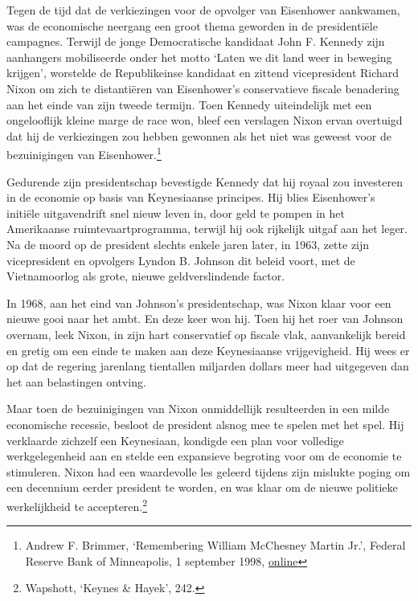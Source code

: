 \documentclass[
  a5paper,
  smalldemyvopaper,11pt,twoside,onecolumn,openright,extrafontsizes]{memoir}
\begin{document}
Tegen de tijd dat de verkiezingen voor de opvolger van Eisenhower
aankwamen, was de economische neergang een groot thema geworden in de
presidentiële campagnes. Terwijl de jonge Democratische kandidaat John
F. Kennedy zijn aanhangers mobiliseerde onder het motto `Laten we dit
land weer in beweging krijgen', worstelde de Republikeinse kandidaat en
zittend vicepresident Richard Nixon om zich te distantiëren van
Eisenhower's conservatieve fiscale benadering aan het einde van zijn
tweede termijn. Toen Kennedy uiteindelijk met een ongelooflijk kleine
marge de race won, bleef een verslagen Nixon ervan overtuigd dat hij de
verkiezingen zou hebben gewonnen als het niet was geweest voor de
bezuinigingen van Eisenhower.\footnote{\hspace{0pt}Andrew F. Brimmer,
  `Remembering William McChesney Martin Jr.', Federal Reserve Bank of
  Minneapolis, 1 september 1998,
  \href{https://www.minneapolisfed.org/article/1998/remembering-william-mcchesney-martin-jr.}{online}}

Gedurende zijn presidentschap bevestigde Kennedy dat hij royaal zou
investeren in de economie op basis van Keynesiaanse principes. Hij blies
Eisenhower's initiële uitgavendrift snel nieuw leven in, door geld te
pompen in het Amerikaanse ruimtevaartprogramma, terwijl hij ook
rijkelijk uitgaf aan het leger. Na de moord op de president slechts
enkele jaren later, in 1963, zette zijn vicepresident en opvolgers
Lyndon B. Johnson dit beleid voort, met de Vietnamoorlog als grote,
nieuwe geldverslindende factor.

In 1968, aan het eind van Johnson's presidentschap, was Nixon klaar voor
een nieuwe gooi naar het ambt. En deze keer won hij. Toen hij het roer
van Johnson overnam, leek Nixon, in zijn hart conservatief op fiscale
vlak, aanvankelijk bereid en gretig om een einde te maken aan deze
Keynesiaanse vrijgevigheid. Hij wees er op dat de regering jarenlang
tientallen miljarden dollars meer had uitgegeven dan het aan belastingen
ontving.

Maar toen de bezuinigingen van Nixon onmiddellijk resulteerden in een
milde economische recessie, besloot de president alsnog mee te spelen
met het spel. Hij verklaarde zichzelf een Keynesiaan, kondigde een plan
voor volledige werkgelegenheid aan en stelde een expansieve begroting
voor om de economie te stimuleren. Nixon had een waardevolle les geleerd
tijdens zijn mislukte poging om een decennium eerder president te
worden, en was klaar om de nieuwe politieke werkelijkheid te
accepteren.\footnote{\hspace{0pt}Wapshott, `Keynes \& Hayek', 242.}
\end{document}
